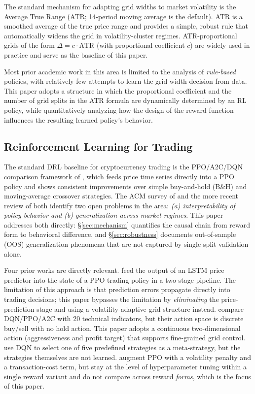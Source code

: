 \documentclass[11pt, a4paper]{article}
\begin{document}
The standard mechanism for adapting grid widths to market volatility is the
Average True Range \citep{wilder1978atr} (ATR; 14-period moving average is the
default). ATR is a smoothed average of the true price range and provides a
simple, robust rule that automatically widens the grid in volatility-cluster
regimes. ATR-proportional grids of the form $\Delta = c \cdot \mathrm{ATR}$
(with proportional coefficient $c$) are widely used in practice and serve as
the baseline of this paper.

Most prior academic work in this area is limited to the analysis of
\emph{rule-based} policies, with relatively few attempts to learn the grid-width
decision from data. This paper adopts a structure in which the proportional
coefficient and the number of grid splits in the ATR formula are dynamically
determined by an RL policy, while quantitatively analyzing how the design of
the reward function influences the resulting learned policy's behavior.

\subsection{Reinforcement Learning for Trading}
\label{sec:related_drl}

The standard DRL baseline for cryptocurrency trading is the PPO/A2C/DQN
comparison framework of \citet{zhang2020drl}, which feeds price time series
directly into a PPO policy and shows consistent improvements over simple
buy-and-hold (B\&H) and moving-average crossover strategies. The ACM survey of
\citet{sun2023rl} and the more recent review of \citet{liu2025review} both
identify two open problems in the area: \emph{(a) interpretability of policy
behavior and (b) generalization across market regimes}. This paper addresses
both directly: \S\ref{sec:mechanism} quantifies the causal chain from reward
form to behavioral difference, and \S\ref{sec:robustness} documents
out-of-sample (OOS) generalization phenomena that are not captured by
single-split validation alone.

Four prior works are directly relevant. \citet{liu2021bitcoin} feed the
output of an LSTM price predictor into the state of a PPO trading policy in a
two-stage pipeline. The limitation of this approach is that prediction errors
propagate directly into trading decisions; this paper bypasses the limitation
by \emph{eliminating} the price-prediction stage and using a volatility-adaptive
grid structure instead. \citet{yasin2024rl} compare DQN/PPO/A2C with 20
technical indicators, but their action space is discrete buy/sell with no hold
action. This paper adopts a continuous two-dimensional action (aggressiveness
and profit target) that supports fine-grained grid control.
\citet{pham2025dqn} use DQN to select one of five predefined strategies as a
meta-strategy, but the strategies themselves are not learned.
\citet{bandarupalli2025risk} augment PPO with a volatility penalty and a
transaction-cost term, but stay at the level of hyperparameter tuning within
a single reward variant and do not compare across reward \emph{forms}, which
is the focus of this paper.
\end{document}
